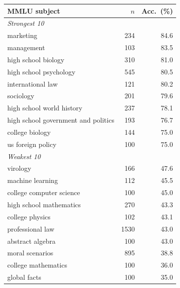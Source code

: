 \begin{tabular}{lrr}
\toprule
MMLU subject & $n$ & Acc.\ (\%) \\
\midrule
\multicolumn{3}{l}{\emph{Strongest 10}}\\
marketing & 234 & 84.6 \\
management & 103 & 83.5 \\
high school biology & 310 & 81.0 \\
high school psychology & 545 & 80.5 \\
international law & 121 & 80.2 \\
sociology & 201 & 79.6 \\
high school world history & 237 & 78.1 \\
high school government and politics & 193 & 76.7 \\
college biology & 144 & 75.0 \\
us foreign policy & 100 & 75.0 \\
\midrule
\multicolumn{3}{l}{\emph{Weakest 10}}\\
virology & 166 & 47.6 \\
machine learning & 112 & 45.5 \\
college computer science & 100 & 45.0 \\
high school mathematics & 270 & 43.3 \\
college physics & 102 & 43.1 \\
professional law & 1530 & 43.0 \\
abstract algebra & 100 & 43.0 \\
moral scenarios & 895 & 38.8 \\
college mathematics & 100 & 36.0 \\
global facts & 100 & 35.0 \\
\bottomrule
\end{tabular}
